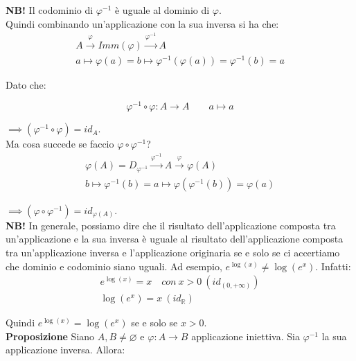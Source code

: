 \documentclass{article}
\begin{document}
\noindent\textbf{NB!} Il codominio di $\varphi^{-1}$ è uguale al dominio di $\varphi$.\\

\noindent Quindi combinando un'applicazione con la sua inversa si ha che:
\begin{gather*}
    A \overset{\varphi}{\longrightarrow} Imm(\varphi) \overset{\varphi^{-1}}{\longrightarrow} A\\
    a \longmapsto \varphi(a) = b \longmapsto \varphi^{-1}(\varphi(a)) = \varphi^{-1}(b) = a
\end{gather*}

\noindent Dato che: 

\begin{equation*}
    \varphi^{-1} \circ \varphi: A \xrightarrow{} A \qquad a \longmapsto a
\end{equation*}

\noindent $\implies (\varphi^{-1} \circ \varphi) = id_A$.\\

\noindent Ma cosa succede se faccio $\varphi \circ \varphi^{-1}$?
\begin{gather*}
    \varphi(A) = D_{\varphi^{-1}} \overset{\varphi^{-1}}{\longrightarrow} A \overset{\varphi}{\longrightarrow} \varphi(A)\\
    b \longmapsto \varphi^{-1} (b) = a \longmapsto \varphi(\varphi^{-1}(b)) = \varphi(a)
\end{gather*}

\noindent $\implies (\varphi \circ \varphi^{-1}) = id_{\varphi(A)}$.\\

\noindent\textbf{NB!} In generale, possiamo dire che il risultato dell'applicazione composta tra un'applicazione e la sua inversa è uguale al risultato dell'applicazione composta tra un'applicazione inversa e l'applicazione originaria se e solo se ci accertiamo che dominio e codominio siano uguali. Ad esempio, $e^{\log(x)} \neq \log(e^x)$. Infatti:
\begin{gather*}
    e^{\log(x)} = x \quad con \ x > 0 \ (id_{(0, +\infty)})\\
    \log(e^x) = x \ (id_\mathbb{R})
\end{gather*}

\noindent Quindi $e^{\log(x)} = \log(e^x)$ se e solo se $x > 0$.\\

\noindent\textbf{Proposizione} Siano $A, B \neq \varnothing$ e $\varphi: A \xrightarrow{} B$ applicazione iniettiva. Sia $\varphi^{-1}$ la sua applicazione inversa. Allora:
\end{document}
